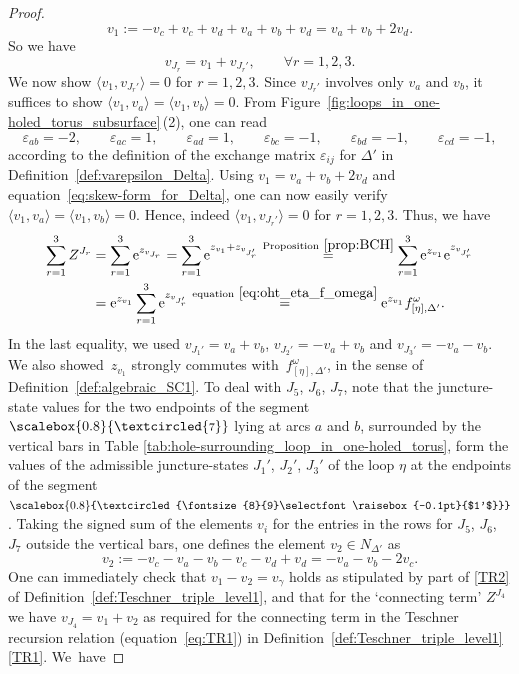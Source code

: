 \documentclass[pdftex]{sigma}
\numberwithin{equation}{section}
\theoremstyle{definition}
\newcommand{\circled}[1]{\scalebox{0.8}{\textcircled{\fontsize{8}{9}\selectfont \raisebox{-0.1pt}{#1}}}}
\begin{document}
\begin{proof}
\[
v_1 := -v_c + v_c+v_d+v_a+v_b+v_d= v_a + v_b + 2v_d.
\]
So we have
\[
v_{J_r} = v_1 + v_{J_r'}, \qquad \forall r=1,2,3.
\]
We now show $\langle v_1, v_{J_r'} \rangle=0$ for $r=1,2,3$. Since $v_{J_r'}$ involves only $v_a$ and $v_b$, it suffices to show $\langle v_1, v_a\rangle = \langle v_1 , v_b \rangle=0$. From Figure~\ref{fig:loops_in_one-holed_torus_subsurface}\,(2), one can read
\[
\varepsilon_{ab} = -2, \qquad
\varepsilon_{ac} = 1, \qquad
\varepsilon_{ad}=1, \qquad
\varepsilon_{bc}=-1,\qquad
\varepsilon_{bd}=-1,\qquad
\varepsilon_{cd}=-1,
\]
according to the definition of the exchange matrix $\varepsilon_{ij}$ for $\Delta'$ in Definition~\ref{def:varepsilon_Delta}. Using $v_1 = v_a+v_b+2v_d$ and equation~\eqref{eq:skew-form_for_Delta}, one can now easily verify $\langle v_1, v_a \rangle = \langle v_1, v_b\rangle=0$. Hence, indeed $\langle v_1,v_{J_r'}\rangle=0$ for $r=1,2,3$. Thus, we have
\begin{align*}
\sum_{r=1}^{3} Z^{J_r} & = \sum_{r=1}^{3} {\rm e}^{z_{v_{J_r}}}
= \sum_{r=1}^{3} {\rm e}^{z_{v_1} + z_{v_{J_r'}}}
 \stackrel{{\rm Proposition}~\ref{prop:BCH}}{=}
\sum_{r=1}^{3} {\rm e}^{z_{v_1}} {\rm e}^{z_{v_{J_r'}}}\\
& = {\rm e}^{z_{v_1}} \sum_{r=1}^{3} {\rm e}^{z_{v_{J_r'}}}
 \stackrel{{\rm equation}~\eqref{eq:oht_eta_f_omega}}{=}
{\rm e}^{z_{v_1}} f^\omega_{[\eta],\Delta'}.
\end{align*}
In the last equality, we used $v_{J_1'} = v_a+v_b$, $v_{J_2'} = -v_a+v_b$ and $v_{J_3'} = -v_a - v_b$. We also showed~$z_{v_1}$ strongly commutes with~$f^\omega_{[\eta],\Delta'}$, in the sense of Definition~\ref{def:algebraic_SC1}.
To deal with $J_5$, $J_6$, $J_7$, note that the juncture-state values for the two endpoints of the segment $\circled{7}$ lying at arcs $a$ and $b$, surrounded by the vertical bars in Table \ref{tab:hole-surrounding_loop_in_one-holed_torus}, form the values of the admissible juncture-states $J_1'$, $J_2'$, $J_3'$ of the loop $\eta$ at the endpoints of the segment $\circled{$1'$}$. Taking the signed sum of the elements $v_i$ for the entries in the rows for $J_5$, $J_6$, $J_7$ outside the vertical bars, one defines the element $v_2 \in N_{\Delta'}$ as
\[
v_2 := -v_c - v_a- v_b - v_c - v_d + v_d = - v_a - v_b - 2v_c.
\]
One can immediately check that $v_1 - v_2 = v_\gamma$ holds as stipulated by part of \ref{TR2} of Definition~\ref{def:Teschner_triple_level1},
and that for the `connecting term' $Z^{J_4}$ we have $v_{J_4} = v_1 + v_2$ as required for the connecting term in the Teschner recursion relation (equation~\eqref{eq:TR1}) in Definition~\ref{def:Teschner_triple_level1}\,\ref{TR1}. We~have

\end{proof}
\end{document}

